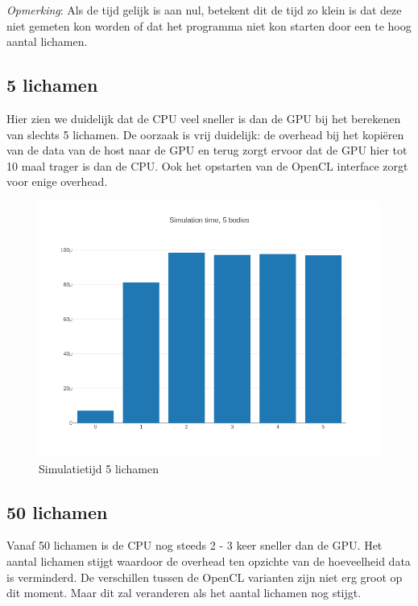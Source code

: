 \documentclass{article}
\begin{document}
\textit{Opmerking}: Als de tijd gelijk is aan nul, betekent dit de tijd zo klein is
dat deze niet gemeten kon worden of dat het programma niet kon starten door een te
hoog aantal lichamen.

\subsection{5 lichamen}

Hier zien we duidelijk dat de CPU veel sneller is dan de GPU bij het berekenen van
slechts 5 lichamen. De oorzaak is vrij duidelijk: de overhead bij het kopi\"{e}ren van
de data van de host naar de GPU en terug zorgt ervoor dat de GPU hier tot 10 maal
trager is dan de CPU. Ook het opstarten van de OpenCL interface zorgt voor enige
overhead.
\begin{figure}[H]
    \includegraphics[width=\linewidth]{./grafiekskes/hist_simulation5.png}
    \caption{Simulatietijd 5 lichamen}
\end{figure}
\subsection{50 lichamen}
Vanaf 50 lichamen is de CPU nog steeds 2 - 3 keer sneller dan de GPU. Het aantal
lichamen stijgt waardoor de overhead ten opzichte van de hoeveelheid data
is verminderd. De verschillen tussen de OpenCL varianten zijn niet erg groot op
dit moment. Maar dit zal veranderen als het aantal lichamen nog stijgt.
\end{document}
